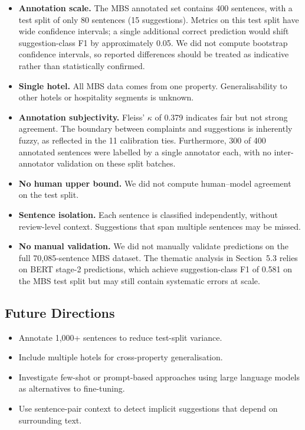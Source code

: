 \begin{itemize}
  \item \textbf{Annotation scale.} The MBS annotated set contains
  400 sentences, with a test split of only 80 sentences (15
  suggestions). Metrics on this test split have wide confidence
  intervals; a single additional correct prediction would shift
  suggestion-class F1 by approximately 0.05. We did not compute
  bootstrap confidence intervals, so reported differences should
  be treated as indicative rather than statistically confirmed.
  \item \textbf{Single hotel.} All MBS data comes from one
  property. Generalisability to other hotels or hospitality
  segments is unknown.
  \item \textbf{Annotation subjectivity.} Fleiss' $\kappa$ of
  0.379 indicates fair but not strong agreement. The boundary
  between complaints and suggestions is inherently fuzzy, as
  reflected in the 11 calibration ties. Furthermore, 300 of 400
  annotated sentences were labelled by a single annotator each,
  with no inter-annotator validation on these split batches.
  \item \textbf{No human upper bound.} We did not compute
  human--model agreement on the test split.
  \item \textbf{Sentence isolation.} Each sentence is classified
  independently, without review-level context. Suggestions that
  span multiple sentences may be missed.
  \item \textbf{No manual validation.} We did not manually
  validate predictions on the full 70,085-sentence MBS dataset.
  The thematic analysis in Section~5.3 relies on BERT stage-2
  predictions, which achieve suggestion-class F1 of 0.581 on the
  MBS test split but may still contain systematic errors at
  scale.
\end{itemize}

\subsection{Future Directions}

\begin{itemize}
  \item Annotate 1,000+ sentences to reduce test-split variance.
  \item Include multiple hotels for cross-property generalisation.
  \item Investigate few-shot or prompt-based approaches using large
  language models as alternatives to fine-tuning.
  \item Use sentence-pair context to detect implicit suggestions
  that depend on surrounding text.
\end{itemize}
